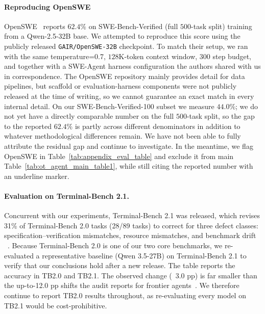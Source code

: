 \documentclass{article}
\begin{document}
\paragraph{Reproducing OpenSWE}
\label{app:eval_reprod_openswe}
OpenSWE~\citep{fu2026davincienvopensweenvironment} reports $62.4\%$ on SWE-Bench-Verified (full $500$-task split) training from a Qwen-2.5-32B base. We attempted to reproduce this score using the publicly released \texttt{GAIR/OpenSWE-32B} checkpoint. To match their setup, we ran with the same temperature=0.7, $128\text{K}$-token context window, 300 step budget, and together with a SWE-Agent harness configuration the authors shared with us in correspondence. The OpenSWE repository mainly provides detail for data pipelines, but scaffold or evaluation-harness components were not publicly released at the time of writing, so we cannot guarantee an exact match in every internal detail. On our SWE-Bench-Verified-100 subset we measure $44.0\%$; we do not yet have a directly comparable number on the full $500$-task split, so the gap to the reported $62.4\%$ is partly across different denominators in addition to whatever methodological differences remain. We have not been able to fully attribute the residual gap and continue to investigate. In the meantime, we flag OpenSWE in Table~\ref{tab:appendix_eval_table} and exclude it from main Table~\ref{tab:ot_agent_main_table1}, while still citing the reported number with an underline marker.



\paragraph{Evaluation on Terminal-Bench 2.1.}
Concurrent with our experiments, Terminal-Bench 2.1 was released, which revises 31\% of Terminal-Bench 2.0 tasks (28/89 tasks) to correct for three defect classes: specification--verification mismatches, resource mismatches, and benchmark drift ~\citep{tb21audit}. Because Terminal-Bench 2.0 is one of our two core benchmarks, we re-evaluated a representative baseline (Qwen 3.5-27B) on Terminal-Bench 2.1 to verify that our conclusions hold after a new release.  The table  reports the accuracy in TB2.0 and TB2.1.  The observed change (~3.0 pp) is far smaller than the up-to-12.0 pp shifts the audit reports for frontier agents~\citep{tb21audit}. We therefore continue to report TB2.0 results throughout, as re-evaluating every model on TB2.1 would be cost-prohibitive.
\end{document}
